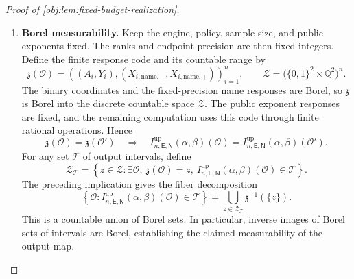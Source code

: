 \begin{proof}[Proof of \cref{obj:lem:fixed-budget-realization}]
\begin{enumerate}
\item \textbf{Borel measurability.}
Keep the engine, policy, sample size, and public exponents fixed. The ranks and endpoint precision are then fixed integers. Define the finite response code and its countable range by
\[
\mathfrak z(\mathcal O)
=
\left(
(A_i,Y_i),
(X_{i,\mathrm{name},-},X_{i,\mathrm{name},+})
\right)_{i=1}^n,
\qquad
\mathcal Z
=
\bigl(\{0,1\}^2\times\mathbb Q^2\bigr)^n.
\]
The binary coordinates and the fixed-precision name responses are Borel, so \(\mathfrak z\) is Borel into the discrete countable space \(\mathcal Z\). The public exponent responses are fixed, and the remaining computation uses this code through finite rational operations. Hence
\[
\mathfrak z(\mathcal O)=\mathfrak z(\mathcal O')
\quad\Longrightarrow\quad
I^{\mathrm{up}}_{n,\mathsf E,\mathsf N}(\alpha,\beta)(\mathcal O)
=
I^{\mathrm{up}}_{n,\mathsf E,\mathsf N}(\alpha,\beta)(\mathcal O').
\]
For any set \(\mathcal T\) of output intervals, define
\[
\mathcal Z_{\mathcal T}
=
\left\{
z\in\mathcal Z:
\exists\mathcal O,\ 
\mathfrak z(\mathcal O)=z,\
I^{\mathrm{up}}_{n,\mathsf E,\mathsf N}(\alpha,\beta)(\mathcal O)
\in\mathcal T
\right\}.
\]
The preceding implication gives the fiber decomposition
\[
\left\{
\mathcal O:
I^{\mathrm{up}}_{n,\mathsf E,\mathsf N}(\alpha,\beta)(\mathcal O)
\in\mathcal T
\right\}
=
\bigcup_{z\in\mathcal Z_{\mathcal T}}
\mathfrak z^{-1}(\{z\}).
\]
This is a countable union of Borel sets. In particular, inverse images of Borel sets of intervals are Borel, establishing the claimed measurability of the output map.
\end{enumerate}
\end{proof}
